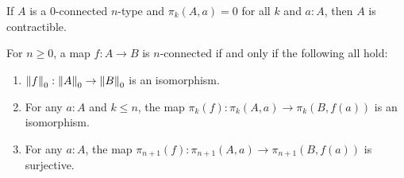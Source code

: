 \documentclass[hott-all.tex]{subfiles}
\begin{document}
% 
% 
% 
% 
% 
\begin{cor}
  If $A$ is a $0$-connected $n$-type and $\pi_k(A,a)=0$ for all $k$ and $a:A$, then $A$ is contractible.
\end{cor}
% 
% 
\begin{cor}
  For $n\ge 0$, a map $f:A\to B$ is $n$-connected if and only if the following all hold:
  \begin{enumerate}
  \item $\trunc0f:\trunc0A \to \trunc0B$ is an isomorphism.
  \item For any $a:A$ and $k\le n$, the map $\pi_k(f):\pi_k(A,a) \to \pi_k(B,f(a))$ is an isomorphism.
  \item For any $a:A$, the map $\pi_{n+1}(f):\pi_{n+1}(A,a) \to \pi_{n+1}(B,f(a))$ is surjective.
  \end{enumerate}
\end{cor}
\end{document}
